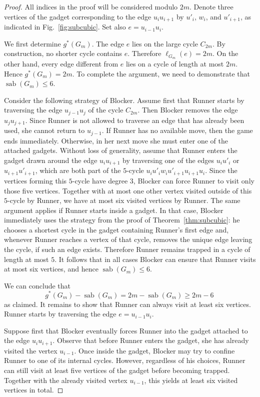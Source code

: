 \documentclass[10pt,a4paper]{amsart}
\DeclareMathOperator{\sab}{\mathrm{sab}}
\begin{document}
\begin{proof}
All indices in the proof will be considered modulo $2m$. Denote three vertices of the gadget corresponding to the edge $u_iu_{i+1}$ by $u'_i$, $w_i$, and $u'_{i+1}$, as indicated in Fig.~\ref{fig:subcubic}. Set also $e = u_{i-1}u_i$.

We first determine $g^\ast(G_m)$. The edge $e$ lies on the large cycle $C_{2m}$. By construction, no shorter cycle contains $e$. Therefore $\ell_{G_m}(e)=2m$. On the other hand, every edge different from $e$ lies on a cycle of length at most $2m$. Hence $g^\ast(G_m)=2m$. To complete the argument, we need to demonstrate that $\sab(G_m) \le 6$.

Consider the following strategy of Blocker. Assume first that Runner starts by traversing the edge  $u_{j-1}u_{j}$ of the cycle $C_{2m}$. Then Blocker removes the edge $u_ju_{j+1}$. Since Runner is not allowed to traverse an edge that has already been used, she cannot return to $u_{j-1}$. If Runner has no available move, then the game ends immediately. Otherwise, in her next move she must enter one of the attached gadgets. Without loss of generality, assume that Runner enters the gadget drawn around the edge $u_iu_{i+1}$ by traversing one of the edges $u_i u'_i$ or $u_{i+1} u'_{i+1}$, which are both part of the $5$-cycle $u_iu'_iw_iu'_{i+1}u_{i+1}u_i$. Since the vertices forming this $5$-cycle have degree $3$, Blocker can force Runner to visit only those five vertices. Together with at most one other vertex visited outside of this $5$-cycle by Runner, we have at most six visited vertices by Runner. The same argument applies if Runner starts inside a gadget. In that case, Blocker immediately uses the strategy from the proof of Theorem~\ref{thm:subcubic}: he chooses a shortest cycle in the gadget containing Runner's first edge and, whenever Runner reaches a vertex of that cycle, removes the unique edge leaving the cycle, if such an edge exists. Therefore Runner remains trapped in a cycle of length at most $5$. It follows that in all cases Blocker can ensure that Runner visits at most six vertices, and hence $\sab(G_m)\le 6$. 

We can conclude that
$$g^\ast(G_m) - \sab(G_m) = 2m - \sab(G_m) \ge 2m -6\,$$
as claimed.
\iffalse
\medskip
It remains to show that Runner can always visit at least six vertices. Runner starts by traversing the edge $e=u_{i-1}u_i$.

Suppose first that Blocker eventually forces Runner into the gadget attached to the edge $u_iu_{i+1}$. Observe that before Runner enters the gadget, she has already visited the vertex $u_{i-1}$. Once inside the gadget, Blocker may try to confine Runner to one of its internal cycles. However, regardless of his choices, Runner can still visit at least five vertices of the gadget before becoming trapped. Together with the already visited vertex $u_{i-1}$, this yields at least six visited vertices in total.


\end{proof}
\end{document}

